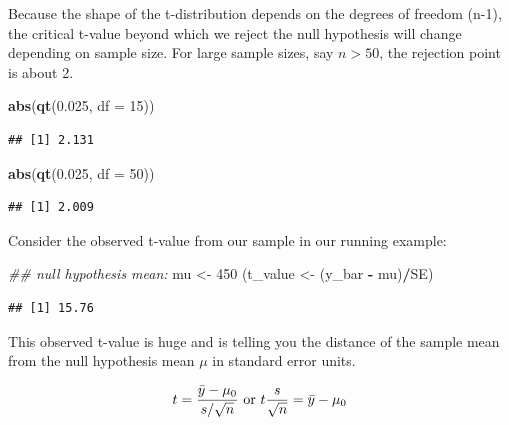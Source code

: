\documentclass[12pt,]{krantz}
\newenvironment{Shaded}{\begin{snugshade}}{\end{snugshade}}
\newcommand{\CommentTok}[1]{\textcolor[rgb]{0.56,0.35,0.01}{\textit{#1}}}
\newcommand{\DataTypeTok}[1]{\textcolor[rgb]{0.13,0.29,0.53}{#1}}
\newcommand{\DecValTok}[1]{\textcolor[rgb]{0.00,0.00,0.81}{#1}}
\newcommand{\FloatTok}[1]{\textcolor[rgb]{0.00,0.00,0.81}{#1}}
\newcommand{\KeywordTok}[1]{\textcolor[rgb]{0.13,0.29,0.53}{\textbf{#1}}}
\newcommand{\NormalTok}[1]{#1}
\newcommand{\OperatorTok}[1]{\textcolor[rgb]{0.81,0.36,0.00}{\textbf{#1}}}
\newcommand{\StringTok}[1]{\textcolor[rgb]{0.31,0.60,0.02}{#1}}
\begin{document}
Because the shape of the t-distribution depends on the degrees of freedom (n-1), the critical t-value beyond which we reject the null hypothesis will change depending on sample size. For large sample sizes, say \(n>50\), the rejection point is about 2.

\begin{Shaded}
\begin{Highlighting}[]
\KeywordTok{abs}\NormalTok{(}\KeywordTok{qt}\NormalTok{(}\FloatTok{0.025}\NormalTok{, }\DataTypeTok{df =} \DecValTok{15}\NormalTok{))}
\end{Highlighting}
\end{Shaded}

\begin{verbatim}
## [1] 2.131
\end{verbatim}

\begin{Shaded}
\begin{Highlighting}[]
\KeywordTok{abs}\NormalTok{(}\KeywordTok{qt}\NormalTok{(}\FloatTok{0.025}\NormalTok{, }\DataTypeTok{df =} \DecValTok{50}\NormalTok{))}
\end{Highlighting}
\end{Shaded}

\begin{verbatim}
## [1] 2.009
\end{verbatim}

Consider the observed t-value from our sample in our running example:

\begin{Shaded}
\begin{Highlighting}[]
\CommentTok{## null hypothesis mean:}
\NormalTok{mu <-}\StringTok{ }\DecValTok{450}
\NormalTok{(t_value <-}\StringTok{ }\NormalTok{(y_bar }\OperatorTok{-}\StringTok{ }\NormalTok{mu)}\OperatorTok{/}\NormalTok{SE)}
\end{Highlighting}
\end{Shaded}

\begin{verbatim}
## [1] 15.76
\end{verbatim}

This observed t-value is huge and is telling you the distance of the sample mean from the null hypothesis mean \(\mu\) in standard error units.

\begin{equation}
t=\frac{\bar{y}-\mu_0}{s/\sqrt{n}} \hbox{ or } t\frac{s}{\sqrt{n}}=\bar{y}-\mu_0
\end{equation}
\end{document}
